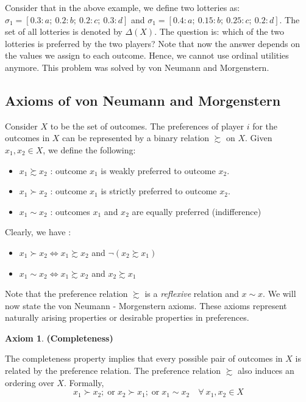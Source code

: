 \documentclass{article}
\theoremstyle{definition}
\newtheorem{ax}{Axiom}
\begin{document}
Consider that in the above example, we define two lotteries as: $\sigma_1 = [0.3 : a; \: 0.2 : b; \: 0.2 : c; \: 0.3 : d]$ and $\sigma_1 = [0.4 : a; \: 0.15 : b; \: 0.25 : c; \: 0.2 : d]$. The set of all lotteries is denoted by $\Delta(X)$. The question is: which of the two lotteries is preferred by the two players? Note that now the answer depends on the values we assign to each outcome. Hence, we cannot use ordinal utilities anymore. This problem was solved by von Neumann and Morgenstern. \medskip

\subsection{Axioms of von Neumann and Morgenstern}

Consider $X$ to be the set of outcomes. The preferences of player $i$ for the outcomes in $X$ can be represented by a binary relation  $\succsim$ on $X$. Given $x_1, x_2 \in X$, we define the following:

\begin{itemize}
    \item $x_1 \succsim x_2$ : outcome $x_1$ is weakly preferred to outcome $x_2$.
    \item $x_1 \succ x_2$ : outcome $x_1$ is strictly preferred to outcome $x_2$.
    \item $x_1 \sim x_2$ : outcomes $x_1$ and $x_2$ are equally preferred (indifference)
\end{itemize}

Clearly, we have :
\begin{itemize}
    \item $x_1 \succ x_2 \iff x_1 \succsim x_2$ and $\neg{(x_2 \succsim x_1)}$
    \item $x_1 \sim x_2 \iff x_1 \succsim x_2$ and $x_2 \succsim x_1$
\end{itemize}

Note that the preference relation $\succsim$ is a \textit{reflexive} relation and $x \sim x$. We will now state the von Neumann - Morgenstern axioms. These axioms represent naturally arising properties or desirable properties in preferences.

\begin{ax}
\textbf{(Completeness)} \smallskip

The completeness property implies that every possible pair of outcomes in $X$ is related by the preference relation. The preference relation $\succsim$ also induces an ordering over $X$. Formally, 
\[
    x_1 \succ x_2; \; \text{or} \; x_2 \succ x_1; \; \text{or} \; x_1 \sim x_2 \quad \forall \: x_1, x_2 \in X
\]
\end{ax}
\end{document}
